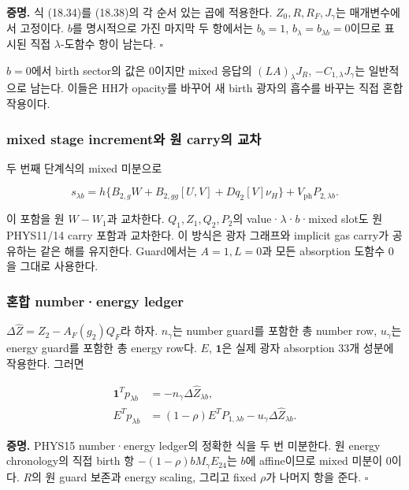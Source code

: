 \textbf{증명.} 식 (18.34)를 (18.38)의 각 순서 있는 곱에 적용한다.
\(Z_0,R,R_F,J_\gamma\)는 매개변수에서 고정이다. \(b\)를 명시적으로 가진
마지막 두 항에서는 \(b_b=1\), \(b_\lambda=b_{\lambda b}=0\)이므로 표시된
직접 \(\lambda\)-도함수 항이 남는다. \(\square\)

\(b=0\)에서 birth sector의 값은 0이지만 mixed 응답의
\((LA)_\lambda J_R\), \(-C_{1,\lambda}J_\gamma\)는 일반적으로 남는다.
이들은 HH가 opacity를 바꾸어 새 birth 광자의 흡수를 바꾸는 직접 혼합
작용이다.

\hypertarget{mixed-stage-incrementuxc640-uxc6d0-carryuxc758-uxad50uxcc28}{%
\subsubsection{mixed stage increment와 원 carry의
교차}\label{mixed-stage-incrementuxc640-uxc6d0-carryuxc758-uxad50uxcc28}}

두 번째 단계식의 mixed 미분으로

\[
\boxed{
s_{\lambda b}
=h\{B_{2,g}W+B_{2,gg}[U,V]+Dq_2[V]\nu_H\}
+V_{\mathrm{ph}}P_{2,\lambda b}.
}
\tag{18.41}
\]

이 포함을 원 \(W-W_1\)과 교차한다. \(Q_1,Z_1,Q_2,P_2\)의
value·\(\lambda\)·\(b\)·mixed slot도 원 PHYS11/14 carry 포함과 교차한다.
이 방식은 광자 그래프와 implicit gas carry가 공유하는 같은 해를
유지한다. Guard에서는 \(A=1,L=0\)과 모든 absorption 도함수 0을 그대로
사용한다.

\hypertarget{uxd63cuxd569-numberenergy-ledger}{%
\subsubsection{혼합 number·energy
ledger}\label{uxd63cuxd569-numberenergy-ledger}}

\(\Delta\widehat Z=Z_2-A_F(g_2)Q_F\)라 하자. \(n_\gamma\)는 number
guard를 포함한 총 number row, \(u_\gamma\)는 energy guard를 포함한 총
energy row다. \(E\), \(\mathbf1\)은 실제 광자 absorption 33개 성분에
작용한다. 그러면

\[
\boxed{\begin{aligned}
\mathbf1^Tp_{\lambda b}&=-n_\gamma\Delta\widehat Z_{\lambda b},\\
E^Tp_{\lambda b}
&=(1-\rho)E^TP_{1,\lambda b}
-u_\gamma\Delta\widehat Z_{\lambda b}.
\end{aligned}}
\tag{18.42}
\]

\textbf{증명.} PHYS15 number·energy ledger의 정확한 식을 두 번 미분한다.
원 energy chronology의 직접 birth 항 \(-(1-\rho)bM_\gamma E_{24}\)는
\(b\)에 affine이므로 mixed 미분이 0이다. \(R\)의 원 guard 보존과 energy
scaling, 그리고 fixed \(\rho\)가 나머지 항을 준다. \(\square\)

